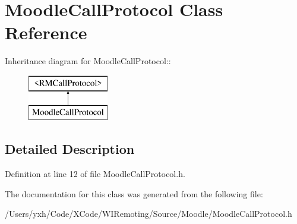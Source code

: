 \hypertarget{interface_moodle_call_protocol}{
\section{MoodleCallProtocol Class Reference}
\label{interface_moodle_call_protocol}
}
Inheritance diagram for MoodleCallProtocol::\begin{figure}[H]
\begin{center}
\leavevmode
\includegraphics[height=2cm]{interface_moodle_call_protocol}
\end{center}
\end{figure}


\subsection{Detailed Description}


Definition at line 12 of file MoodleCallProtocol.h.

The documentation for this class was generated from the following file:\begin{DoxyCompactItemize}
\item 
/Users/yxh/Code/XCode/WIRemoting/Source/Moodle/MoodleCallProtocol.h\end{DoxyCompactItemize}

